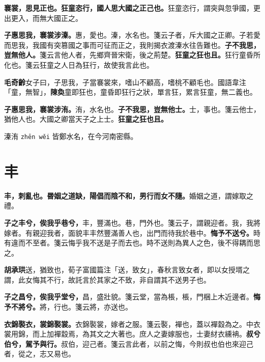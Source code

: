 
\textbf{褰裳，思見正也。狂童恣行，國人思大國之正己也。}{\footnotesize 狂童恣行，謂突與忽爭國，更出更入，而無大國正之。}

\textbf{子惠思我，褰裳涉溱。}{\footnotesize 惠，愛也。溱，水名也。箋云子者，斥大國之正卿。子若愛而思我，我國有突篡國之事而可征而正之，我則揭衣渡溱水往告難也。}\textbf{子不我思，豈無他人。}{\footnotesize 箋云言他人者，先鄉齊晉宋衛，後之荊楚。}\textbf{狂童之狂也且。}{\footnotesize 狂行童昏所化也。箋云狂童之人日為狂行，故使我言此也。}

\begin{quoting}\textbf{毛奇齡}女子曰，子思我，子當褰裳來，嗜山不顧高，嗜桃不顧毛也。國語韋注「童，無智」，\textbf{陳奐}童即狂也，童昏即狂行之狀，單言狂，累言狂童，無二義也。\end{quoting}

\textbf{子惠思我，褰裳涉洧。}{\footnotesize 洧，水名也。}\textbf{子不我思，豈無他士。}{\footnotesize 士，事也。箋云他士，猶他人也。大國之卿當天子之上士。}\textbf{狂童之狂也且。}

\begin{quoting}溱洧 \texttt{zhēn wěi} 皆鄭水名，在今河南密縣。\end{quoting}

\section{丰}


\textbf{丰，刺亂也。昬姻之道缺，陽倡而陰不和，男行而女不隨。}{\footnotesize 婚姻之道，謂嫁取之禮。}

\textbf{子之丰兮，俟我乎巷兮，}{\footnotesize 丰，豐滿也。巷，門外也。箋云子，謂親迎者。我，我將嫁者。有親迎我者，面貌丰丰然豐滿善人也，出門而待我於巷中。}\textbf{悔予不送兮。}{\footnotesize 時有違而不至者。箋云悔乎我不送是子而去也。時不送則為異人之色，後不得耦而思之。}

\begin{quoting}\textbf{胡承珙}送，猶致也，荀子富國篇注「送，致女」，春秋言致女者，即以女授壻之謂，此女悔其不行，故託言於其家之不致，非自謂其不送男子也。\end{quoting}

\textbf{子之昌兮，俟我乎堂兮，}{\footnotesize 昌，盛壯貌。箋云堂，當為棖，棖，門梱上木近邊者。}\textbf{悔予不將兮。}{\footnotesize 將，行也。箋云將，亦送也。}

\textbf{衣錦褧衣，裳錦褧裳。}{\footnotesize 衣錦褧裳，嫁者之服。箋云褧，襌也，蓋以襌縠為之。中衣裳用錦，而上加襌縠焉，為其文之大著也。庶人之妻嫁服也，士妻䊷衣纁袡。}\textbf{叔兮伯兮，駕予與行。}{\footnotesize 叔伯，迎己者。箋云言此者，以前之悔，今則叔也伯也來迎己者，從之，志又易也。}

